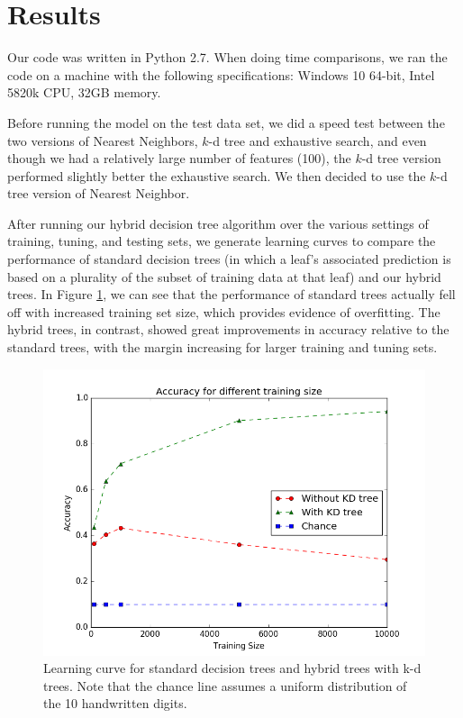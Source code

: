 \section{Results}
Our code was written in Python 2.7. When doing time comparisons, we ran the code on a machine with the following specifications: Windows 10 64-bit, Intel 5820k CPU, 32GB memory.

Before running the model on the test data set, we did a speed test between the two versions of Nearest Neighbors, $k$-d tree and exhaustive search, and even though we had a relatively large number of features (100), the $k$-d tree version performed slightly better the exhaustive search. We then decided to use the $k$-d tree version of Nearest Neighbor. 

After running our hybrid decision tree algorithm over the various settings of training, tuning, and testing sets, we generate learning curves to compare the performance of standard decision trees (in which a leaf's associated prediction is based on a plurality of the subset of training data at that leaf) and our hybrid trees.  In Figure \ref{fig:learn_curve}, we can see that the performance of standard trees actually fell off with increased training set size, which provides evidence of overfitting. The hybrid trees, in contrast, showed great improvements in accuracy relative to the standard trees, with the margin increasing for larger training and tuning sets.

\begin{figure}
	\includegraphics[width=\linewidth]{Figures/learning_curve.png}
	\caption{Learning curve for standard decision trees and hybrid trees with k-d trees.  Note that the chance line assumes a uniform distribution of the 10 handwritten digits.}
	\label{fig:learn_curve}
\end{figure}

